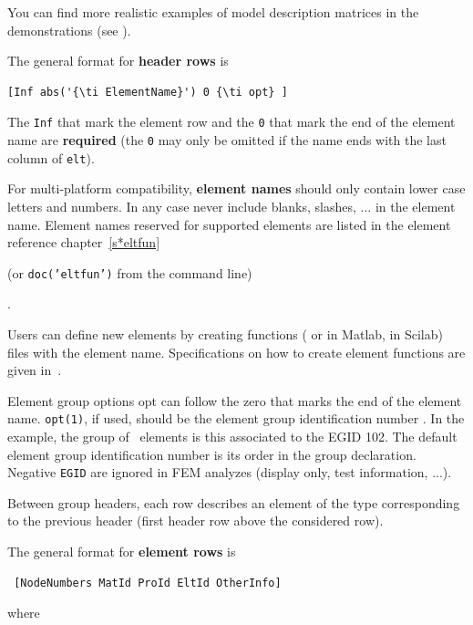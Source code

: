 You can find more realistic examples of model description matrices in the demonstrations (see ).


\lvs\noindent The general format for {\bf header rows} is

\begin{verbatim}
[Inf abs('{\ti ElementName}') 0 {\ti opt} ]
\end{verbatim}

\noindent The {\tt Inf} that mark the element row and the {\tt 0} that mark the end of the element name are {\bf required} (the {\tt 0} may only be omitted if the name ends with the last column of {\tt elt}).

For multi-platform compatibility, {\bf element names} should only contain lower case letters and numbers.  In any case never include blanks, slashes, ... in the element name.  Element names reserved for supported elements are listed in the element reference chapter~\ref{s*eltfun} \begin{SDT} (or {\tt doc('eltfun')} from the command line) \end{SDT}.


Users can define new elements by creating functions ( or  in Matlab,  in Scilab) files with the element name.  Specifications on how to create element functions are given in~. 

\lvs Element group options {\ti opt} can follow the zero that marks the end of the element name. {\tt opt(1)}, if used, should be the element group identification number .  In the example, the group of \mass\ elements is this associated to the {\ti EGID} 102.  
The default element group identification number is its order in the group declaration.  Negative {\tt EGID} are ignored in FEM analyzes (display only, test information, ...).

Between group headers, each row describes an element of the type corresponding to the previous header (first header row above the considered row).

\lvs\noindent The general format for {\bf element rows} is

\begin{verbatim}
 [NodeNumbers MatId ProId EltId OtherInfo]
\end{verbatim}

\noindent where

